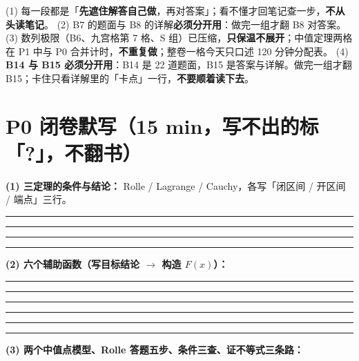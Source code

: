 \documentclass[10pt,a4paper]{ctexart}
\begin{document}
\normalsize
\begin{keypoint}[路线图的两条纪律]
(1) 每一段都是「\textbf{先遮住解答自己做}，再对答案」；看不懂才回笔记查一步，\textbf{不从头读笔记}。
(2) B7 的题面与 B8 的详解\textbf{必须分开用}：做完一组才翻 B8 对答案。
(3) 数列极限（B6、九宫格第 7 格、S 组）已压缩，\textbf{只保温不展开}；中值定理两格在 P1 中与 P0 合并计时，\textbf{不重复做}；整卷一格今天只口述 120 分钟分配表。
(4) \textbf{B14 与 B15 必须分开用}：B14 是 22 道题面，B15 是答案与详解。做完一组才翻 B15；卡住只看详解里的「卡点」一行，\textbf{不要顺着读下去}。
\end{keypoint}

\clearpage

\section*{P0 闭卷默写（15 min，写不出的标「?」，不翻书）}
\textbf{(1) 三定理的条件与结论：} Rolle / Lagrange / Cauchy，各写「闭区间 / 开区间 / 端点」三行。
\par\smallskip\noindent\rule{\linewidth}{0.25pt}\par\vspace{0.52cm}
\noindent\rule{\linewidth}{0.25pt}\par\vspace{0.52cm}
\noindent\rule{\linewidth}{0.25pt}\par\vspace{0.52cm}
\noindent\rule{\linewidth}{0.25pt}\par\vspace{0.52cm}
\textbf{(2) 六个辅助函数（写目标结论 $\to$ 构造 $F(x)$）：}
\par\smallskip\noindent\rule{\linewidth}{0.25pt}\par\vspace{0.52cm}
\noindent\rule{\linewidth}{0.25pt}\par\vspace{0.52cm}
\noindent\rule{\linewidth}{0.25pt}\par\vspace{0.52cm}
\noindent\rule{\linewidth}{0.25pt}\par\vspace{0.52cm}
\noindent\rule{\linewidth}{0.25pt}\par\vspace{0.52cm}
\noindent\rule{\linewidth}{0.25pt}\par\vspace{0.52cm}
\textbf{(3) 两个中值点模型、Rolle 答题五步、条件三查、证不等式三条路：}
\end{document}
